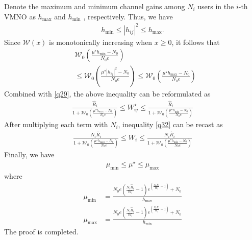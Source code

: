 \documentclass[journal]{IEEEtran}
\begin{document}
Denote the maximum and minimum channel gains among $N_i$ users in the $i$-th VMNO as $h_{\mbox{max}}$ and $h_{\mbox{min}}$  , respectively. Thus, we have
\begin{align}
h_{\mbox{min}} \leq \left|h_{ij}\right|^2 \leq h_{\mbox{max}}.
\end{align}
Since $\mathcal{W}\left(x\right)$ is monotonically increasing when $x \geq 0$, it follows that
\begin{align}
&\mathcal{W}_0\left(\frac{\mu^\star h_{\mbox{min}} - N_0}{N_0e}\right) \nonumber \\ & \leq  \mathcal{W}_0 \left(\frac{\mu^\star\left|h_{ij}\right|^2 - N_0}{N_0e}\right) \leq  \mathcal{W}_0\left(\frac{\mu^\star h_{\mbox{max}} - N_0}{N_0e}\right)
\end{align}
Combined with \eqref{q29}, the above inequality can be reformulated as
\begin{align}
\frac{\hat{R}_i}{1 + \mathcal{W}_0\left(\frac{\mu^\star h_{\mbox{max}} - N_0}{N_0e}\right)} \leq W_{ij}^\star \leq \frac{\hat{R}_i}{1 + \mathcal{W}_0\left(\frac{\mu^\star h_{\mbox{min}} - N_0}{N_0e}\right)} \label{q32}
\end{align}
After multiplying each term with $N_i$, inequality \eqref{q32} can be recast as
\begin{align}
\frac{N_i\hat{R}_i}{1 + \mathcal{W}_0\left(\frac{\mu^\star h_{\mbox{max}} - N_0}{N_0e}\right)} \leq W_{i} \leq \frac{N_i\hat{R}_i}{1 + \mathcal{W}_0\left(\frac{\mu^\star h_{\mbox{min}} - N_0}{N_0e}\right)} 
\end{align}
Finally, we have
\begin{align}
\mu_{\mbox{min}} \leq \mu^\star \leq \mu_{\mbox{max}}
\end{align}
where 
\begin{align}
\mu_{\mbox{min}} &= \frac{N_0e\left(\frac{N_i\hat{R}_i}{W_i} - 1\right)e^{\left(\frac{N_i\hat{R}_i}{W_i} - 1\right)} + N_0}{h_{\mbox{max}}}  \\
\mu_{\mbox{max}} & = \frac{N_0e\left(\frac{N_i\hat{R}_i}{W_i} - 1\right)e^{\left(\frac{N_i\hat{R}_i}{W_i} - 1\right)} + N_0}{h_{\mbox{min}}}
\end{align}
The proof is completed.
 
\end{document}
